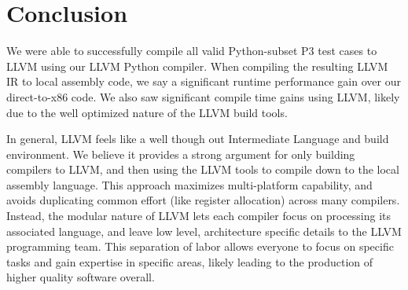 \documentclass[11pt,twocolumn]{article}
\begin{document}
\section{Conclusion}

We were able to successfully compile all valid Python-subset P3 test
cases to LLVM using our LLVM Python compiler. When compiling the
resulting LLVM IR to local assembly code, we say a significant runtime
performance gain over our direct-to-x86 code. We also saw significant
compile time gains using LLVM, likely due to the well optimized nature
of the LLVM build tools.

In general, LLVM feels like a well though out Intermediate Language and
build environment. We believe it provides a strong argument for only
building compilers to LLVM, and then using the LLVM tools to compile
down to the local assembly language. This approach maximizes
multi-platform capability, and avoids duplicating common effort (like
register allocation) across many compilers. Instead, the modular nature
of LLVM lets each compiler focus on processing its associated
language, and leave low level, architecture specific details to the
LLVM programming team. This separation of labor allows everyone to
focus on specific tasks and gain expertise in specific areas, likely
leading to the production of higher quality software overall.

\nocite{*}
\printbibliography
\end{document}
